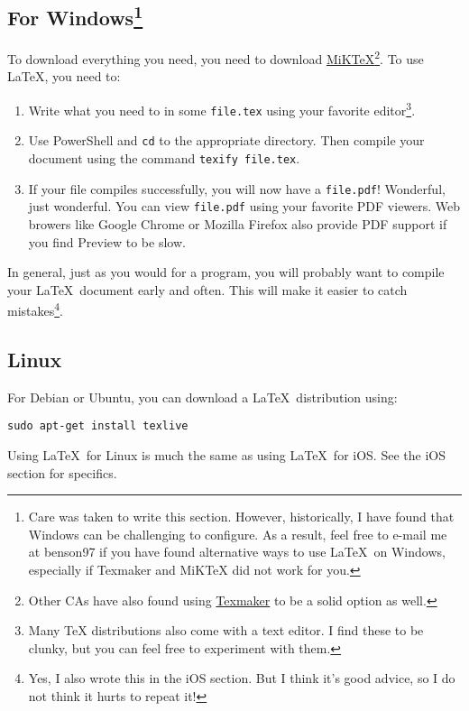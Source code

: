 \documentclass[11pt]{article}
\begin{document}
\subsection*{For Windows\footnote{Care was taken to write this section. However, historically, I have found that Windows can be challenging to configure. As a result, feel free to e-mail me at benson97 if you have found alternative ways to use \LaTeX\ on Windows, especially if Texmaker and MiKTeX did not work for you.}}
To download everything you need, you need to download \href{https://miktex.org/download}{MiKTeX}\footnote{Other CAs have also found using \href{https://www.xm1math.net/texmaker/}{Texmaker} to be a solid option as well.}. To use \LaTeX, you need to:
\begin{enumerate}
\item Write what you need to in some \texttt{file.tex} using your favorite editor\footnote{Many TeX distributions also come with a text editor. I find these to be clunky, but you can feel free to experiment with them.}.

\item Use PowerShell and \texttt{cd} to the appropriate directory. Then compile your document using the command \texttt{texify file.tex}.

\item If your file compiles successfully, you will now have a \texttt{file.pdf}! Wonderful, just wonderful. You can view \texttt{file.pdf} using your favorite PDF viewers. Web browers like Google Chrome or Mozilla Firefox also provide PDF support if you find Preview to be slow.
\end{enumerate}

In general, just as you would for a program, you will probably want to compile your \LaTeX\ document early and often.
This will make it easier to catch mistakes\footnote{Yes, I also wrote this in the iOS section. But I think it's good advice, so I do not think it hurts to repeat it!}.

\subsection*{Linux}
For Debian or Ubuntu, you can download a \LaTeX\ distribution using:
\begin{center}
\texttt{sudo apt-get install texlive}
\end{center}
Using \LaTeX\ for Linux is much the same as using \LaTeX\ for iOS. See the iOS section for specifics.

\newpage
\end{document}
